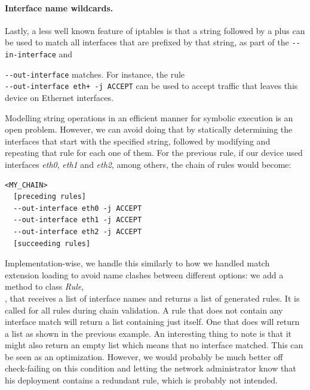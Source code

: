 \paragraph{Interface name wildcards.}
Lastly, a less well known feature of iptables is that a string followed by a
plus can be used to match all interfaces that are prefixed by that string, as
part of the \lstinline{--in-interface} and {\lstinline{--out-interface}
matches.  For instance, the rule\\
\lstinline{--out-interface eth+ -j ACCEPT} can be used to accept traffic that
leaves this device on Ethernet interfaces.

Modelling string operations in an efficient manner for symbolic execution is an
open problem.  However, we can avoid doing that by statically determining the
interfaces that start with the specified string, followed by modifying and
repeating that rule for each one of them.  For the previous rule, if our device
used interfaces \emph{eth0}, \emph{eth1} and \emph{eth2}, among others, the
chain of rules would become:

\begin{listing}
  \lstset{numbers=none, frame=single, basicstyle=\ttfamily,
    xleftmargin=0.25\textwidth, xrightmargin=0.25\textwidth
  }
  \small
  \begin{lstlisting}
<MY_CHAIN>
  [preceding rules]
  --out-interface eth0 -j ACCEPT
  --out-interface eth1 -j ACCEPT
  --out-interface eth2 -j ACCEPT
  [succeeding rules]
  \end{lstlisting}
\end{listing}

Implementation-wise, we handle this similarly to how we handled match extension
loading to avoid name clashes between different options: we add a method to
class \emph{Rule},\\ ,
that receives a list of interface names and returns a list of generated rules.
It is called for all rules during chain validation.  A rule that does not
contain any interface match will return a list containing just itself.  One
that does will return a list as shown in the previous example.  An interesting
thing to note is that it might also return an empty list which means that no
interface matched.  This can be seen as an optimization.  However, we would
probably be much better off check-failing on this condition and letting the
network administrator know that his deployment contains a redundant rule, which
is probably not intended.


}
